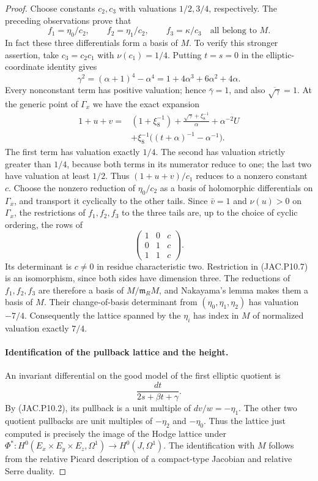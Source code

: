\documentclass[11pt,a4paper]{article}
\begin{document}
\begin{proof}
Choose constants $c_2,c_3$ with valuations $1/2,3/4$, respectively.
The preceding observations prove that
\[
 f_1=\eta_0/c_2,\qquad f_2=\eta_1/c_2,
 \qquad f_3=\kappa/c_3
 \quad\text{all belong to }M.                            \tag{JAC.P10.8}
\]
In fact these three differentials form a basis of $M$. To verify
this stronger assertion, take $c_3=c_2c_1$ with $\nu(c_1)=1/4$.
Putting $t=s=0$ in the elliptic-coordinate identity gives
\[
 \gamma^2=(\alpha+1)^4-\alpha^4
   =1+4\alpha^3+6\alpha^2+4\alpha.
\]
Every nonconstant term has positive valuation; hence
$\bar\gamma=1$, and also $\overline{\sqrt\gamma}=1$.
At the generic point of $\Gamma_x$ we have the exact expansion
\[
 \begin{split}
 1+u+v={}&(1+\xi_8^{-1})
       +\frac{\sqrt\gamma+\xi_8^{-1}}{\alpha}
       +\alpha^{-2}U\\
 &+\xi_8^{-1}\bigl((t+\alpha)^{-1}-\alpha^{-1}\bigr).
 \end{split}                                             \tag{JAC.P10.8a}
\]
The first term has valuation exactly $1/4$. The second has valuation
strictly greater than $1/4$, because both terms in its numerator
reduce to one; the last two have valuation at least $1/2$.
Thus $(1+u+v)/c_1$ reduces to a nonzero constant $c$.
Choose the nonzero reduction of $\eta_0/c_2$ as a basis of
holomorphic differentials on $\Gamma_x$, and transport it cyclically
to the other tails. Since $\bar v=1$ and $\nu(u)>0$
on $\Gamma_x$, the restrictions of $f_1,f_2,f_3$ to the three tails
are, up to the choice of cyclic ordering, the rows of
\[
 \begin{pmatrix}
 1&0&c\\ 0&1&c\\ 1&1&c
 \end{pmatrix}.
                                                        \tag{JAC.P10.8b}
\]
Its determinant is $c\ne0$ in residue characteristic two.
Restriction in (JAC.P10.7) is an isomorphism, since both sides have
dimension three. The reductions of $f_1,f_2,f_3$ are therefore a
basis of $M/\mathfrak m_R M$, and Nakayama's lemma makes them a
basis of $M$. Their change-of-basis determinant from
$(\eta_0,\eta_1,\eta_2)$ has valuation $-7/4$.
Consequently the lattice spanned by the $\eta_i$ has index in $M$
of normalized valuation exactly $7/4$.

\paragraph{Identification of the pullback lattice and the height.}
An invariant differential on the good model of the first elliptic
quotient is
\[
 \frac{dt}{2s+\beta t+\gamma}.
\]
By (JAC.P10.2), its pullback is a unit multiple of $dv/w=-\eta_1$.
The other two quotient pullbacks are unit multiples of
$-\eta_2$ and $-\eta_0$. Thus the lattice just computed is precisely
the image of the Hodge lattice under
$\Phi^*:H^0(E_x\times E_y\times E_z,\Omega^1)\to H^0(J,\Omega^1)$.
The identification with $M$ follows from the relative Picard
description of a compact-type Jacobian and relative Serre duality.


\end{proof}
\end{document}
